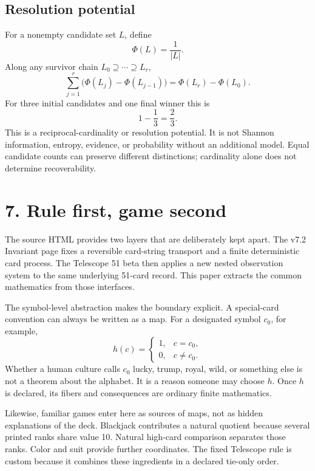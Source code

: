 \documentclass[9pt]{extarticle}
\theoremstyle{cgplain}
\theoremstyle{definition}
\begin{document}
\subsection*{Resolution potential}
For a nonempty candidate set $L$, define
\[
\Phi(L)=\frac1{|L|}.
\tag{21}
\]
Along any survivor chain $L_0\supseteq\cdots\supseteq L_r$,
\[
\sum_{j=1}^r\bigl(\Phi(L_j)-\Phi(L_{j-1})\bigr)
=\Phi(L_r)-\Phi(L_0).
\tag{22}
\]
For three initial candidates and one final winner this is
\[
1-\frac13=\frac23.
\tag{23}
\]
This is a reciprocal-cardinality or resolution potential. It is not Shannon information, entropy, evidence, or probability without an additional model. Equal candidate counts can preserve different distinctions; cardinality alone does not determine recoverability.

\section*{7. Rule first, game second}
The source HTML provides two layers that are deliberately kept apart. The v7.2 Invariant page fixes a reversible card-string transport and a finite deterministic card process. The Telescope 51 beta then applies a new nested observation system to the same underlying 51-card record. This paper extracts the common mathematics from those interfaces.

The symbol-level abstraction makes the boundary explicit. A special-card convention can always be written as a map. For a designated symbol $c_0$, for example,
\[
h(c)=\begin{cases}1,&c=c_0,\\0,&c\neq c_0.\end{cases}
\tag{24}
\]
Whether a human culture calls $c_0$ lucky, trump, royal, wild, or something else is not a theorem about the alphabet. It is a reason someone may choose $h$. Once $h$ is declared, its fibers and consequences are ordinary finite mathematics.

Likewise, familiar games enter here as sources of maps, not as hidden explanations of the deck. Blackjack contributes a natural quotient because several printed ranks share value 10. Natural high-card comparison separates those ranks. Color and suit provide further coordinates. The fixed Telescope rule is custom because it combines these ingredients in a declared tie-only order.
\end{document}
